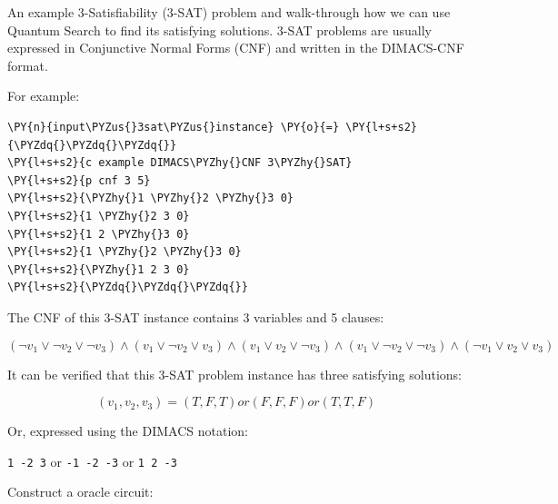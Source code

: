 An example 3-Satisfiability (3-SAT) problem and walk-through how we can
use Quantum Search to find its satisfying solutions. 3-SAT problems are
usually expressed in Conjunctive Normal Forms (CNF) and written in the
DIMACS-CNF format.

For example:

    \begin{tcolorbox}[breakable, size=fbox, boxrule=1pt, pad at break*=1mm,colback=cellbackground, colframe=cellborder]
\begin{Verbatim}[commandchars=\\\{\}]
\PY{n}{input\PYZus{}3sat\PYZus{}instance} \PY{o}{=} \PY{l+s+s2}{\PYZdq{}\PYZdq{}\PYZdq{}}
\PY{l+s+s2}{c example DIMACS\PYZhy{}CNF 3\PYZhy{}SAT}
\PY{l+s+s2}{p cnf 3 5}
\PY{l+s+s2}{\PYZhy{}1 \PYZhy{}2 \PYZhy{}3 0}
\PY{l+s+s2}{1 \PYZhy{}2 3 0}
\PY{l+s+s2}{1 2 \PYZhy{}3 0}
\PY{l+s+s2}{1 \PYZhy{}2 \PYZhy{}3 0}
\PY{l+s+s2}{\PYZhy{}1 2 3 0}
\PY{l+s+s2}{\PYZdq{}\PYZdq{}\PYZdq{}}
\end{Verbatim}
\end{tcolorbox}

    The CNF of this 3-SAT instance contains 3 variables and 5 clauses:

\[
(\neg v_1 \lor \neg v_2 \lor \neg v_3) \land (v_1 \lor \neg v_2 \lor v_3) \land ( v_1 \lor v_2 \lor \neg v_3) \land (v_1 \lor \neg v_2 \lor \neg v_3) \land (\neg v_1 \lor v_2 \lor v_3)
\]

It can be verified that this 3-SAT problem instance has three satisfying
solutions:

\[
(v_1, v_2, v_3) = (T,F,T) or (F,F,F) or (T,T,F)
\]

Or, expressed using the DIMACS notation:

\texttt{1\ -2\ 3} or \texttt{-1\ -2\ -3} or \texttt{1\ 2\ -3}

Construct a oracle circuit:

